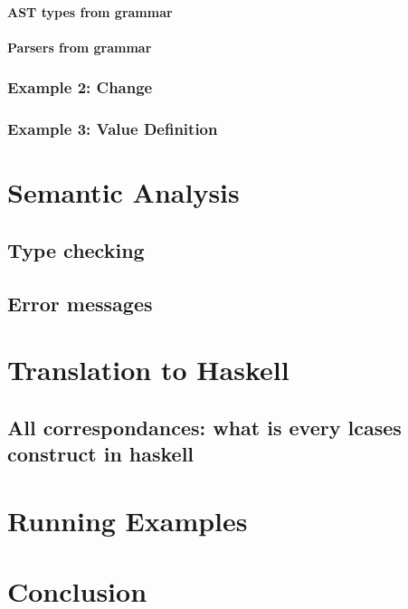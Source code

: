 \documentclass{article}
\def\H{Haskell}
\begin{document}
\paragraph{AST types from grammar}

\paragraph{Parsers from grammar}

\subsubsection{Example 2: Change}

\subsubsection{Example 3: Value Definition}

\section{Semantic Analysis}

\subsection{Type checking}

\subsection{Error messages}

\section{Translation to \H}

\subsection{All correspondances: what is every lcases construct in haskell}

\section{Running Examples}

\section{Conclusion}

\newpage
\printbibliography
\end{document}
